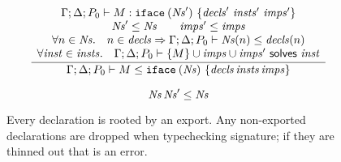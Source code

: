 \begin{figure}


\[
\frac{
\begin{array}{c}
\Gamma; \Delta; P_0 \vdash M : \texttt{iface}\:(\mathit{Ns}')~\{\mathit{decls}'~\mathit{insts}'~\mathit{imps}'\} \\
\mathit{Ns}' \le \mathit{Ns} \qquad
\mathit{imps}' \le \mathit{imps} \\
\forall n \in \mathit{Ns}.\quad n \in \mathit{decls} \Rightarrow \Gamma; \Delta; P_0 \vdash \mathit{Ns}(n) \le \mathit{decls}(n) \\
\forall \mathit{inst} \in \mathit{insts}.\quad \Gamma; \Delta; P_0 \vdash \{ M \} \cup \mathit{imps} \cup \mathit{imps}' ~\textsf{solves}~ \mathit{inst}
\end{array}
}{
\Gamma; \Delta; P_0 \vdash M \le \texttt{iface}\:(\mathit{Ns})~\{\mathit{decls}\, \mathit{insts}\, \mathit{imps}\}
}
\]


\[
\mathit{Ns}\, \mathit{Ns}' \le \mathit{Ns}
\]

\caption{
Every declaration is rooted by an export.  Any non-exported declarations are dropped when typechecking signature; if they are thinned out that is an error.
}


\end{figure}


